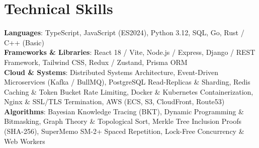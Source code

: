 \documentclass[letterpaper,10pt]{article}
\begin{document}
\section{Technical Skills}
\begin{itemize}[leftmargin=0.15in, label={}]
  \small{\item{
    \textbf{Languages}{: TypeScript, JavaScript (ES2024), Python 3.12, SQL, Go, Rust / C++ (Basic)} \\
    \textbf{Frameworks \& Libraries}{: React 18 / Vite, Node.js / Express, Django / REST Framework, Tailwind CSS, Redux / Zustand, Prisma ORM} \\
    \textbf{Cloud \& Systems}{: Distributed Systems Architecture, Event-Driven Microservices (Kafka / BullMQ), PostgreSQL Read-Replicas \& Sharding, Redis Caching \& Token Bucket Rate Limiting, Docker \& Kubernetes Containerization, Nginx \& SSL/TLS Termination, AWS (ECS, S3, CloudFront, Route53)} \\
    \textbf{Algorithms}{: Bayesian Knowledge Tracing (BKT), Dynamic Programming \& Bitmasking, Graph Theory \& Topological Sort, Merkle Tree Inclusion Proofs (SHA-256), SuperMemo SM-2+ Spaced Repetition, Lock-Free Concurrency \& Web Workers}
  }}
\end{itemize}

\end{document}
